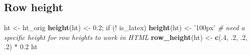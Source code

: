 \documentclass[]{article}
\newenvironment{Shaded}{\begin{snugshade}}{\end{snugshade}}
\newcommand{\KeywordTok}[1]{\textcolor[rgb]{0.13,0.29,0.53}{\textbf{{#1}}}}
\newcommand{\DecValTok}[1]{\textcolor[rgb]{0.00,0.00,0.81}{{#1}}}
\newcommand{\FloatTok}[1]{\textcolor[rgb]{0.00,0.00,0.81}{{#1}}}
\newcommand{\StringTok}[1]{\textcolor[rgb]{0.31,0.60,0.02}{{#1}}}
\newcommand{\CommentTok}[1]{\textcolor[rgb]{0.56,0.35,0.01}{\textit{{#1}}}}
\newcommand{\NormalTok}[1]{{#1}}
\begin{document}
\FloatBarrier

\subsection{Row height}\label{row-height}

\begin{Shaded}
\begin{Highlighting}[]
\NormalTok{ht <-}\StringTok{ }\NormalTok{ht_orig}
\KeywordTok{height}\NormalTok{(ht) <-}\StringTok{ }\FloatTok{0.2}\NormalTok{; }
\NormalTok{if (!}\StringTok{ }\NormalTok{is_latex) }\KeywordTok{height}\NormalTok{(ht) <-}\StringTok{ '100px'} \CommentTok{# need a specific height for row heights to work in HTML}
\KeywordTok{row_height}\NormalTok{(ht) <-}\StringTok{ }\KeywordTok{c}\NormalTok{(.}\DecValTok{4}\NormalTok{, .}\DecValTok{2}\NormalTok{, .}\DecValTok{2}\NormalTok{, .}\DecValTok{2}\NormalTok{) *}\StringTok{ }\FloatTok{0.2}
\NormalTok{ht}
\end{Highlighting}
\end{Shaded}
\end{document}
